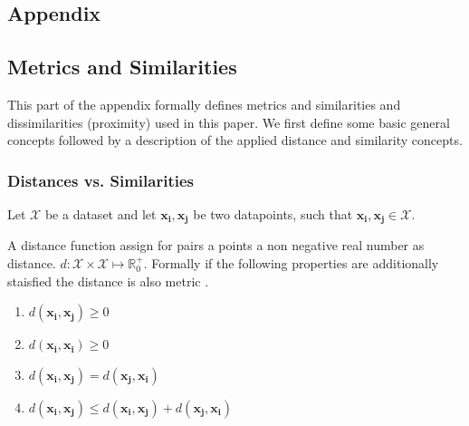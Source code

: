\documentclass[12pt,a4paper,bibliography=totocnumbered,listof=totocnumbered]{scrartcl}
\begin{document}
\renewcommand\refname{List of Literature}






\pagebreak

\rhead{}
\setcounter{page}{1}

\begin{appendix}
	
\section*{Appendix}
{}

\subsection*{Metrics and Similarities}

This part of the appendix formally defines metrics and similarities and dissimilarities (proximity) used in this paper. We first define some basic general concepts followed by a description of the applied distance and similarity concepts. 

\subsubsection*{Distances vs. Similarities}

Let $\mathcal{X}$ be a dataset and let $\boldsymbol{x_i},\boldsymbol{x_j}$ be two datapoints, such that $\boldsymbol{x_i},\boldsymbol{x_j} \in \mathcal{X}$. 

A distance function assign for pairs a points a non negative real number as distance. $d:\mathcal{X}\times \mathcal{X} \mapsto \mathbb{R}_0^+$. Formally if the following properties are additionally staisfied the distance is also metric \cite[page 28]{Shirali06a}.

\begin{enumerate}
	\setlength{\itemsep}{-5pt}
	\item $d(\boldsymbol{x_i},\boldsymbol{x_j}) \ge 0$
	\item $d(\boldsymbol{x_i},\boldsymbol{x_i}) \ge 0$
	\item $d(\boldsymbol{x_i},\boldsymbol{x_j}) = d(\boldsymbol{x_j},\boldsymbol{x_i}) $
	\item $d(\boldsymbol{x_i},\boldsymbol{x_j}) \le d(\boldsymbol{x_i},\boldsymbol{x_j})+ d(\boldsymbol{x_j},\boldsymbol{x_i}) $
\end{enumerate}


\end{appendix}
\end{document}
